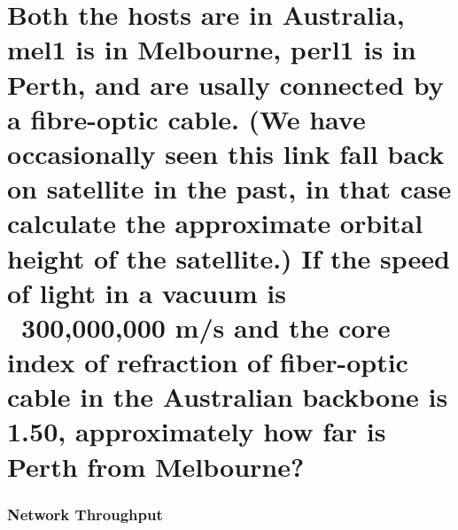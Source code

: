 \documentclass[9pt, addpoints, answers]{exam}
\begin{document}
\begin{questions}
\begin{parts}
    \begin{solution}

    \end{solution}


     \part[2]{Both the hosts are in Australia, mel1 is in Melbourne, perl1
     is in Perth, and are usally connected by a fibre-optic cable. (We have
     occasionally seen this link fall back on satellite in the past, in 
     that case calculate the approximate orbital height of the satellite.) If 
     the speed of light 
     in a vacuum is ~300,000,000 m/s and the core index of refraction of 
     fiber-optic cable in the Australian
     backbone is 1.50, approximately how far is Perth from Melbourne?}
    \begin{solution}

    \end{solution}
\end{parts}

\newpage
     \section*{Network Throughput}
  \question
\end{questions}
\end{document}
